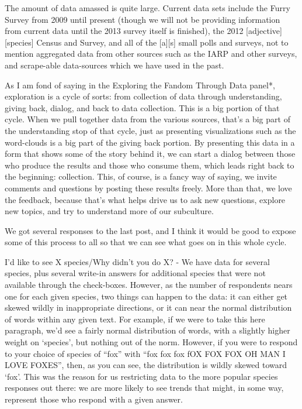 The amount of data amassed is quite large. Current data sets include the Furry Survey from 2009 until present (though we will not be providing information from current data until the 2013 survey itself is finished), the 2012 {[}adjective{]}{[}species{]} Census and Survey, and all of the {[}a{]}{[}s{]} small polls and surveys, not to mention aggregated data from other sources such as the IARP and other surveys, and scrape-able data-sources which we have used in the past.

As I am fond of saying in the Exploring the Fandom Through Data panel*, exploration is a cycle of sorts: from collection of data through understanding, giving back, dialog, and back to data collection. This is a big portion of that cycle. When we pull together data from the various sources, that's a big part of the understanding stop of that cycle, just as presenting visualizations such as the word-clouds is a big part of the giving back portion. By presenting this data in a form that shows some of the story behind it, we can start a dialog between those who produce the results and those who consume them, which leads right back to the beginning: collection. This, of course, is a fancy way of saying, we invite comments and questions by posting these results freely. More than that, we love the feedback, because that's what helps drive us to ask new questions, explore new topics, and try to understand more of our subculture.

We got several responses to the last post, and I think it would be good to expose some of this process to all so that we can see what goes on in this whole cycle.

I'd like to see X species/Why didn't you do X? - We have data for several species, plus several write-in answers for additional species that were not available through the check-boxes. However, as the number of respondents nears one for each given species, two things can happen to the data: it can either get skewed wildly in inappropriate directions, or it can near the normal distribution of words within any given text. For example, if we were to take this here paragraph, we'd see a fairly normal distribution of words, with a slightly higher weight on `species', but nothing out of the norm. However, if you were to respond to your choice of species of ``fox'' with ``fox fox fox fOX FOX FOX OH MAN I LOVE FOXES'', then, as you can see, the distribution is wildly skewed toward `fox'. This was the reason for us restricting data to the more popular species responses out there: we are more likely to see trends that might, in some way, represent those who respond with a given answer.

